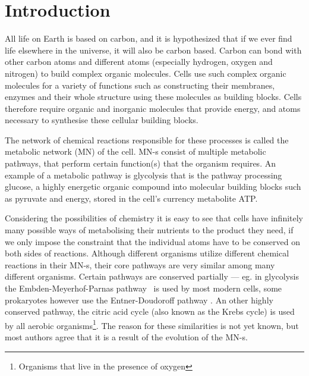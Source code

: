 \documentclass[a4paper,12pt]{article}
\begin{document}
	\newpage
	\section{Introduction}

	All life on Earth is based on carbon, and it is hypothesized that if we ever find life elsewhere in the universe, it will also be carbon based. %
	Carbon can bond with other carbon atoms and different atoms (especially hydrogen, oxygen and nitrogen) to build complex organic molecules. Cells use such complex organic molecules for a variety of functions such as constructing their membranes, enzymes and their whole structure using these molecules as building blocks. Cells therefore require organic and inorganic molecules that provide energy, and atoms necessary to synthesise these cellular building blocks.

	The network of chemical reactions responsible for these processes is called the metabolic network (MN) of the cell. MN-s consist of multiple metabolic pathways, that perform certain function(s) that the organism requires. An example of a metabolic pathway is glycolysis that is the pathway processing glucose, a highly energetic organic compound into molecular building blocks such as pyruvate and energy, stored in the cell's currency metabolite ATP.
	
	Considering the possibilities of chemistry it is easy to see that cells have infinitely many possible ways of metabolising their nutrients to the product they need, if we only impose the constraint that the individual atoms have to be conserved on both sides of reactions. Although different organisms utilize different chemical reactions in their MN-s, their core pathways are very similar among many different organisms. Certain pathways are conserved partially --- eg. in glycolysis the Embden-Meyerhof-Parnas pathway \cite{EMPpathway}~is used by most modern cells, some prokaryotes however use the Entner-Doudoroff pathway \cite{EDpathway}. An other highly conserved pathway, the citric acid cycle (also known as the Krebs cycle) is used by all aerobic organisms\footnote{Organisms that live in the presence of oxygen}.
	The reason for these similarities is not yet known, but most authors agree that it is a result of the evolution of the MN-s. 
\end{document}
